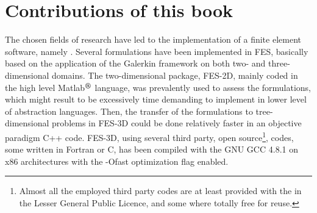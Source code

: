 \section{Contributions of this book}

The chosen fields of research have led to the implementation of a finite element software, namely . Several formulations have been implemented in FES, basically based on the application of the Galerkin framework on both two- and three-dimensional domains. The two-dimensional package, FES-2D, mainly coded in the high level Matlab$^\text{\circledR}$ language, was prevalently used to assess the formulations, which might result to be excessively time demanding to implement in lower level of abstraction languages. Then, the transfer of the formulations to tree-dimensional problems in FES-3D could be done relatively faster in an objective paradigm C++ code. FES-3D, using several third party, open source\footnote{Almost all the employed third party codes are at least provided with the in the Lesser General Public Licence, and some where totally free for reuse.}, codes, some written in Fortran or C, has been compiled with the GNU GCC 4.8.1 on {x86} architectures with the -Ofast optimization flag enabled.

